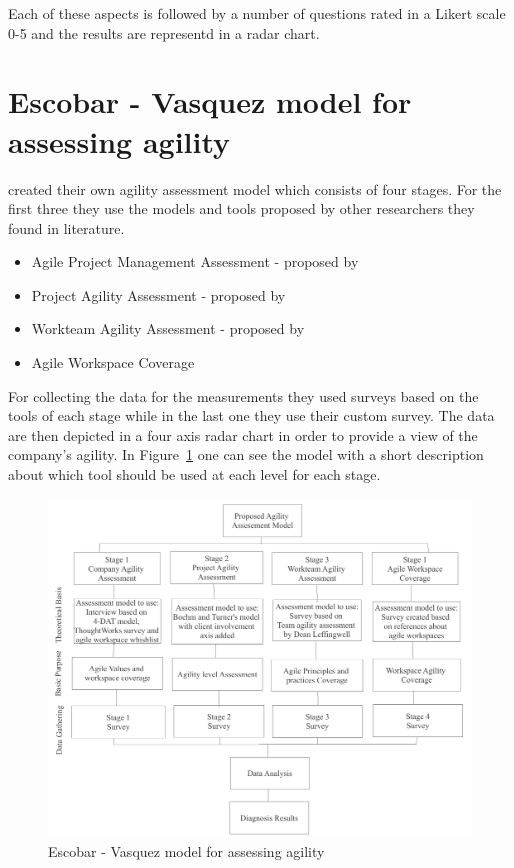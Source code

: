 Each of these aspects is followed by a number of questions rated in a Likert scale 0-5 and the results are representd in a radar chart.


\section{Escobar - Vasquez model for assessing agility}

\citet{6427226} created their own agility assessment model which consists of four stages. For the first three they use the models and tools proposed by other researchers they found in literature.
\begin{itemize}
\item Agile Project Management Assessment - proposed by \citet{qumer2006measuring}
\item Project Agility Assessment - proposed by \citet{taylor}
\item Workteam Agility Assessment - proposed by \citet{Leffingwell}
\item Agile Workspace Coverage
\end{itemize}

For collecting the data for the measurements they used surveys based on the tools of each stage while in the last one they use their custom survey. The data are then depicted in a four axis radar chart in order to provide a view of the company's agility. In Figure~\ref{escobar_model} one can see the model with a short description about which tool should be used at each level for each stage.

\begin{figure} [H]
\centerline{\includegraphics[scale=0.75]{include/relatedwork/fig/escobar_model.pdf}}
\caption{Escobar - Vasquez model for assessing agility} 
\label{escobar_model}
\end{figure}

